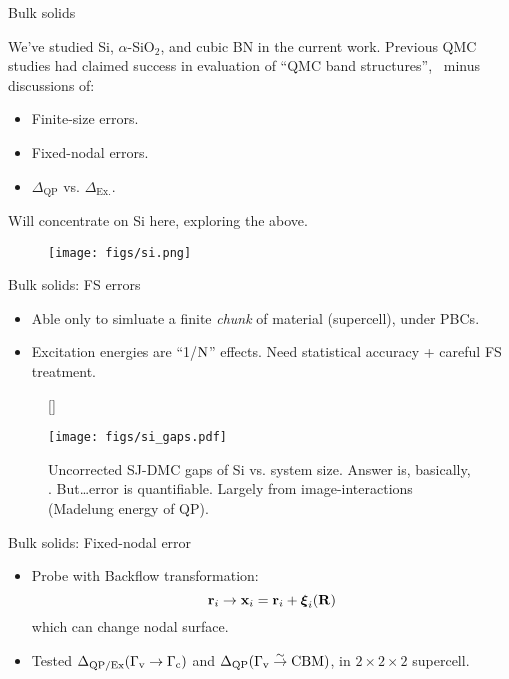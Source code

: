 \documentclass[12pt, pdf, hyperref={draft}, usenames, dvipsnames]{beamer}
\newcommand{\red}[1]{{\bf\color{LancsRed}{#1}}}
\begin{document}
\begin{frame}{Bulk solids}

We've studied Si, $\alpha$-SiO$_2$, and cubic BN in the current work. Previous
QMC studies had claimed success in evaluation of ``QMC band
structures'',~
minus discussions of:

\begin{minipage}[t]{0.35\textwidth}
\vspace{0.3cm}
\begin{itemize}
  \item Finite-size errors.
  \item Fixed-nodal errors.
  \item $\Delta_{\text{QP}}$ vs. $\Delta_{\text{Ex.}}$.
\end{itemize}
\vspace{0.3cm}
Will concentrate on Si here, exploring the above.
\end{minipage}%
\hfill
\begin{minipage}[t]{0.55\textwidth}
\begin{figure}[H]
  \centering
  \texttt{[image: figs/si.png]}
\label{fig:silicon}
\end{figure}
\end{minipage}%
\end{frame}

\begin{frame}{Bulk solids: FS errors}
\begin{itemize}
  \item Able only to simluate a finite \textit{chunk} of material
  (supercell), under PBCs.
  \item Excitation energies are ``1/${\rm N}$'' effects. Need statistical
  accuracy + careful FS treatment.
\end{itemize}
\begin{figure}[H]
  [\FBwidth]
  {\caption{Uncorrected SJ-DMC gaps of Si vs. system size. Answer is,
  basically, \red{no}. But\ldots error is quantifiable. Largely from
  image-interactions (Madelung energy of QP).}\label{fig:si_gaps}}
  {\texttt{[image: figs/si\_gaps.pdf]}}
\end{figure}
\end{frame}

\begin{frame}{Bulk solids: Fixed-nodal error}
\begin{itemize}
  \item Probe with Backflow transformation:
  \begin{equation}
    {\bf r}_i \rightarrow {\bf x}_i = {\bf r}_i + {\boldsymbol \xi}_i({\bf R})
  \end{equation}
  which can change nodal surface.~
  \item Tested $\Delta_{\text{QP/Ex}}(\Gamma_{\rm v} \rightarrow \Gamma_{\rm
  c})$ and $\Delta_{\text{QP}}(\Gamma_{\rm v} \overset{\sim}{\rightarrow}
  \text{CBM})$, in $2\times2\times2$ supercell.
\end{itemize}
\end{frame}
\end{document}
